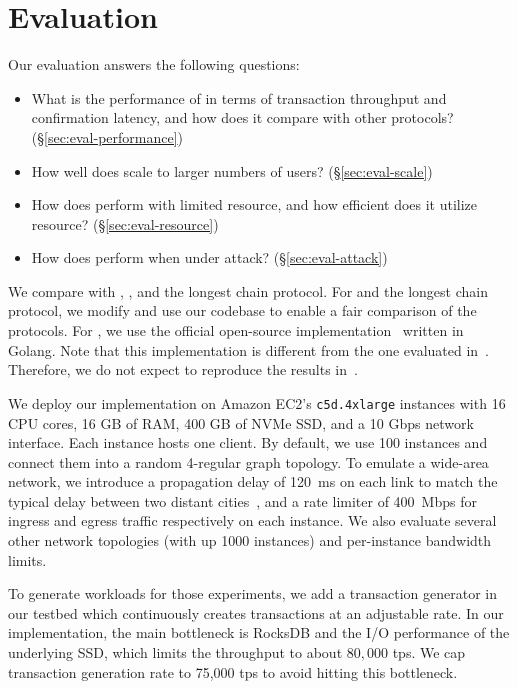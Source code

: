 \section{Evaluation}
\label{sec:eval}

Our evaluation answers the following questions:

\begin{itemize}
    \item What is the performance of \prism in terms of transaction throughput and confirmation latency, and how does it compare with other protocols? (\S\ref{sec:eval-performance})
    \item How well does \prism scale to larger numbers of users? (\S\ref{sec:eval-scale})
    \item How does \prism perform with limited resource, and how efficient does it utilize resource? (\S\ref{sec:eval-resource})
    \item How does \prism perform when under attack? (\S\ref{sec:eval-attack})
\end{itemize}


 We compare \prism with \algorand, \bng, and the longest chain protocol. For \bng and the longest chain protocol, we modify and use our \prism codebase to enable a fair comparison of the protocols. For \algorand, we use the official open-source implementation~\cite{algorandcode} written in Golang. Note that this implementation is different from the one evaluated in~\cite{algorand}. Therefore, we do not expect to reproduce the results in~\cite{algorand}.

 We deploy our \prism implementation on Amazon EC2's \texttt{c5d.4xlarge} instances with 16 CPU cores, 16 GB of RAM, 400 GB of NVMe SSD, and a 10 Gbps network interface. Each instance hosts one \prism client. By default, we use 100 instances and connect them into a random 4-regular graph topology. To emulate a wide-area network, we introduce a propagation delay of 120~ms on each link to match the typical delay between two distant cities~\cite{pingmeasurement}, and a rate limiter of 400~Mbps for ingress and egress traffic respectively on each instance. We also evaluate several other network topologies (with up 1000 instances) and per-instance bandwidth limits.

To generate workloads for those experiments, we add a transaction generator in our testbed which continuously creates transactions at an adjustable rate. In our \prism implementation, the main bottleneck is RocksDB and the I/O performance of the underlying SSD, which limits the throughput to about $80,000$ tps. 
We cap transaction generation rate to 75,000 tps to avoid hitting this bottleneck.

